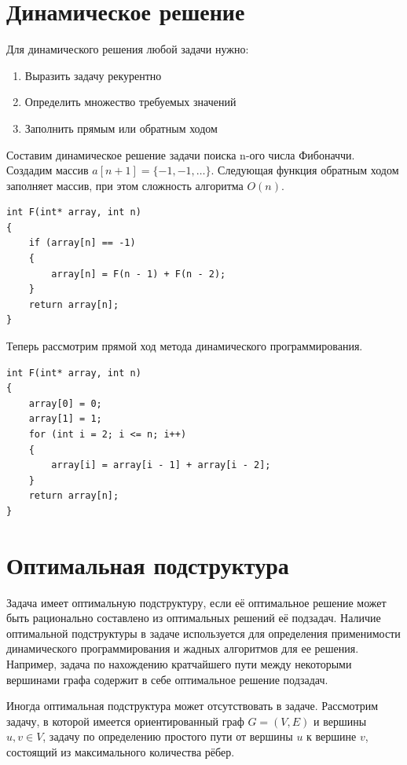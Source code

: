 \documentclass[a4paper,12pt] {report} 			%
\begin{document}
\section{Динамическое решение}

Для динамического решения любой задачи нужно:

\begin{enumerate}
	\item Выразить задачу рекурентно
	\item Определить множество требуемых значений
	\item Заполнить прямым или обратным ходом
\end{enumerate}

Составим динамическое решение задачи поиска n-ого числа Фибоначчи. Создадим массив $a[n + 1] = \{-1, -1, \ldots \}$. 
Следующая функция обратным ходом заполняет массив, при этом сложность алгоритма $O(n)$.

\lstset{language = C++}
\begin{lstlisting}
int F(int* array, int n)
{
	if (array[n] == -1)
	{
		array[n] = F(n - 1) + F(n - 2);
	}
	return array[n];
}
\end{lstlisting}

Теперь рассмотрим прямой ход метода динамического программирования.

\lstset{language = C++}
\begin{lstlisting}
int F(int* array, int n)
{
	array[0] = 0;
	array[1] = 1;
	for (int i = 2; i <= n; i++)
	{
		array[i] = array[i - 1] + array[i - 2];
	}
	return array[n];
}
\end{lstlisting}

\section{Оптимальная подструктура}

Задача имеет оптимальную подструктуру, если её оптимальное решение может быть рационально составлено из оптимальных 
решений её подзадач. Наличие оптимальной подструктуры в задаче используется для определения применимости динамического 
программирования и жадных алгоритмов для ее решения. Например, задача по нахождению кратчайшего пути между 
некоторыми вершинами графа содержит в себе оптимальное решение подзадач.

Иногда оптимальная подструктура может отсутствовать в задаче. Рассмотрим задачу, в которой имеется 
ориентированный граф $G=(V,E)$ и вершины $u,v \in V$, задачу по определению простого 
пути от вершины $u$ к вершине $v$, состоящий из максимального количества рёбер.
\end{document}
